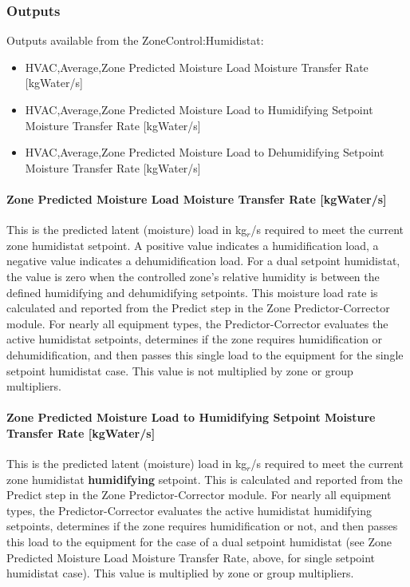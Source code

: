 \subsubsection{Outputs}\label{outputs-2-027}

Outputs available from the ZoneControl:Humidistat:

\begin{itemize}
\item
  HVAC,Average,Zone Predicted Moisture Load Moisture Transfer Rate {[}kgWater/s{]}
\item
  HVAC,Average,Zone Predicted Moisture Load to Humidifying Setpoint Moisture Transfer Rate {[}kgWater/s{]}
\item
  HVAC,Average,Zone Predicted Moisture Load to Dehumidifying Setpoint Moisture Transfer Rate {[}kgWater/s{]}
\end{itemize}

\paragraph{Zone Predicted Moisture Load Moisture Transfer Rate {[}kgWater/s{]}}\label{zone-predicted-moisture-load-moisture-transfer-rate-kgwaters}

This is the predicted latent (moisture) load in kg\(_{r}\)/s required to meet the current zone humidistat setpoint. A positive value indicates a humidification load, a negative value indicates a dehumidification load. For a dual setpoint humidistat, the value is zero when the controlled zone's relative humidity is between the defined humidifying and dehumidifying setpoints. This moisture load rate is calculated and reported from the Predict step in the Zone Predictor-Corrector module. For nearly all equipment types, the Predictor-Corrector evaluates the active humidistat setpoints, determines if the zone requires humidification or dehumidification, and then passes this single load to the equipment for the single setpoint humidistat case. This value is not multiplied by zone or group multipliers.

\paragraph{Zone Predicted Moisture Load to Humidifying Setpoint Moisture Transfer Rate {[}kgWater/s{]}}\label{zone-predicted-moisture-load-to-humidifying-setpoint-moisture-transfer-rate-kgwaters}

This is the predicted latent (moisture) load in kg\(_{r}\)/s required to meet the current zone humidistat \textbf{humidifying} setpoint. This is calculated and reported from the Predict step in the Zone Predictor-Corrector module. For nearly all equipment types, the Predictor-Corrector evaluates the active humidistat humidifying setpoints, determines if the zone requires humidification or not, and then passes this load to the equipment for the case of a dual setpoint humidistat (see Zone Predicted Moisture Load Moisture Transfer Rate, above, for single setpoint humidistat case). This value is multiplied by zone or group multipliers.

